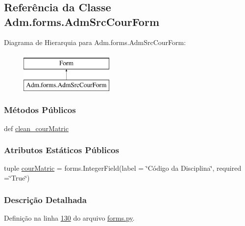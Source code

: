 \hypertarget{classAdm_1_1forms_1_1AdmSrcCourForm}{\subsection{Referência da Classe Adm.\-forms.\-Adm\-Src\-Cour\-Form}
\label{classAdm_1_1forms_1_1AdmSrcCourForm}
}
Diagrama de Hierarquia para Adm.\-forms.\-Adm\-Src\-Cour\-Form\-:\begin{figure}[H]
\begin{center}
\leavevmode
\includegraphics[height=2.000000cm]{de/d02/classAdm_1_1forms_1_1AdmSrcCourForm}
\end{center}
\end{figure}
\subsubsection*{Métodos Públicos}
\begin{DoxyCompactItemize}
\item 
def \hyperlink{classAdm_1_1forms_1_1AdmSrcCourForm_a8684781005b67d50c8a7dc53709d2c24}{clean\-\_\-cour\-Matric}
\end{DoxyCompactItemize}
\subsubsection*{Atributos Estáticos Públicos}
\begin{DoxyCompactItemize}
\item 
tuple \hyperlink{classAdm_1_1forms_1_1AdmSrcCourForm_ad1687195ebe49268ac1cccbcaab2cd83}{cour\-Matric} = forms.\-Integer\-Field(label = \char`\"{}Código da Disciplina\char`\"{}, required =\char`\"{}True\char`\"{})
\end{DoxyCompactItemize}


\subsubsection{Descrição Detalhada}


Definição na linha \hyperlink{Adm_2forms_8py_source_l00130}{130} do arquivo \hyperlink{Adm_2forms_8py_source}{forms.\-py}.




